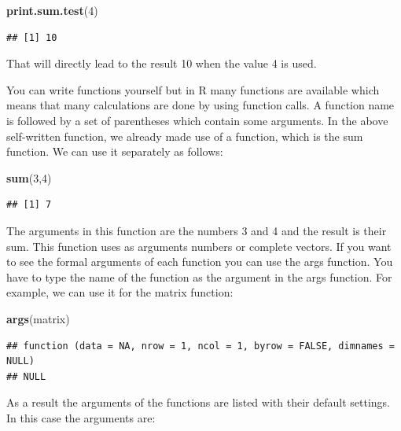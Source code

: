 \documentclass[]{book}
\newenvironment{Shaded}{\begin{snugshade}}{\end{snugshade}}
\newcommand{\KeywordTok}[1]{\textcolor[rgb]{0.13,0.29,0.53}{\textbf{#1}}}
\newcommand{\DecValTok}[1]{\textcolor[rgb]{0.00,0.00,0.81}{#1}}
\newcommand{\NormalTok}[1]{#1}
\theoremstyle{definition}
\theoremstyle{definition}
\theoremstyle{definition}
\theoremstyle{remark}
\begin{document}
\begin{Shaded}
\begin{Highlighting}[]
\KeywordTok{print.sum.test}\NormalTok{(}\DecValTok{4}\NormalTok{)}
\end{Highlighting}
\end{Shaded}

\begin{verbatim}
## [1] 10
\end{verbatim}

That will directly lead to the result 10 when the value 4 is used.

You can write functions yourself but in R many functions are available
which means that many calculations are done by using function calls. A
function name is followed by a set of parentheses which contain some
arguments. In the above self-written function, we already made use of a
function, which is the sum function. We can use it separately as
follows:

\begin{Shaded}
\begin{Highlighting}[]
\KeywordTok{sum}\NormalTok{(}\DecValTok{3}\NormalTok{,}\DecValTok{4}\NormalTok{)}
\end{Highlighting}
\end{Shaded}

\begin{verbatim}
## [1] 7
\end{verbatim}

The arguments in this function are the numbers 3 and 4 and the result is
their sum. This function uses as arguments numbers or complete vectors.
If you want to see the formal arguments of each function you can use the
args function. You have to type the name of the function as the argument
in the args function. For example, we can use it for the matrix
function:

\begin{Shaded}
\begin{Highlighting}[]
\KeywordTok{args}\NormalTok{(matrix)}
\end{Highlighting}
\end{Shaded}

\begin{verbatim}
## function (data = NA, nrow = 1, ncol = 1, byrow = FALSE, dimnames = NULL) 
## NULL
\end{verbatim}

As a result the arguments of the functions are listed with their default
settings. In this case the arguments are:
\end{document}

